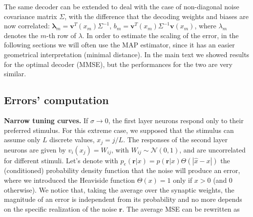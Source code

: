\documentclass[a4paper]{article}%
\begin{document}
The same decoder can be extended to deal with the case of non-diagonal noise covariance matrix $\Sigma$, with the difference that the decoding weights and biases are now
correlated: $\mathbf{\lambda}_{m} = \mathbf{v}^{T}(x_{m})\Sigma^{-1}$, $b_{m}
= \mathbf{v}^{T}(x_{m})\Sigma^{-1}\mathbf{v}(x_{m})$, where $\lambda_{m}$
denotes the $m$-th row of $\lambda$. In order to estimate the scaling of the
error, in the following sections we will often use the MAP estimator, since it
has an easier geometrical interpretation (minimal distance). In the main text
we showed results for the optimal decoder (MMSE), but the performances for the
two are very similar. \newline\newline

\subsection{Errors' computation}

\textbf{Narrow tuning curves.} If $\sigma\rightarrow0$, the first layer
neurons respond only to their preferred stimulus. For this extreme case, we
supposed that the stimulus can assume only $L$ discrete values, $x_{j} =
j/L$. The responses of the second layer neurons are given by
$v_{i}(x_{j}) = W_{ij}$, with $W_{ij} \sim\mathcal{N}(0,1) $, and are
uncorrelated for different stimuli. Let's denote with $p_{e}(\mathbf{r}|x) =
p(\mathbf{r}|x)\Theta\left(|\hat{x}-x|\right)$ the (conditioned) probability density
function that the noise will produce an error, where we introduced the
Heaviside function $\Theta(x) = 1$ only if $x>0$ (and 0 otherwise). We notice
that, taking the average over the synaptic weights, the magnitude of an error
is independent from its probability and no more depends on the specific
realization of the noise $\mathbf{r}$. The average MSE can be rewritten as
\end{document}
